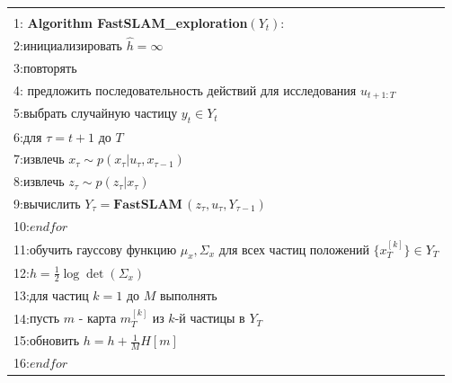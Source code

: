 \documentclass[10pt,a4paper]{article}
\begin{document}
\begin{table}[H]
\begin{center}
\begin{tabular}{|l|}
\hline
{}\\
1:\textbf{ Algorithm FastSLAM\_exploration}$(Y_t):\qquad\qquad\qquad\qquad\qquad$\\
2:\hspace{5mm}$\textit{инициализировать}\,\,\hat{h}=\infty$\\
3:\hspace{5mm}$\textit{повторять}$\\
4:\hspace{10mm}
$\textit{предложить последовательность действий для исследования}\,\,u_{t+1:T}$\\
5:\hspace{10mm}$\textit{выбрать случайную частицу}\,\,y_t\in Y_t$\\
6:\hspace{10mm}$\textit{для}\,\,\tau=t+1\,\,\textit{до}\,\,T$\\
7:\hspace{15mm}$\textit{извлечь}\,\,x_{\tau}\sim p(x_{\tau}|u_{\tau},x_{\tau-1})$\\
8:\hspace{15mm}$\textit{извлечь}\,\,z_{\tau}\sim p(z_{\tau}|x_{\tau})$\\
9:\hspace{15mm}$\textit{вычислить}\,\,Y_{\tau}=\textbf{FastSLAM}\,(z_{\tau},u_{\tau},Y_{\tau-1})$\\
10:\hspace{9mm}$\textit{endfor}$\\
11:\hspace{9mm}$\textit{обучить гауссову функцию}\,\,\mu_x,\varSigma_x\,\,\textit{для всех частиц положений}\,\,\{x_T^{[k]}\}\in Y_T$\\
12:\hspace{9mm}$h=\frac{1}{2}\log\det(\varSigma_x)$\\
13:\hspace{9mm}$\textit{для частиц}\,\,k=1\,\,\textit{до}\,\,M\,\,\textit{выполнять}$\\
14:\hspace{14mm}$\textit{пусть m - карта}\,\,m_T^{[k]}\,\,\textit{из k-й частицы в}\,\,Y_T$\\
15:\hspace{14mm}$\textit{обновить}\,\,h=h+\frac{1}{M}H[m]$\\
16:\hspace{9mm}$\textit{endfor}$\\

\end{tabular}
\end{center}
\end{table}
\end{document}
